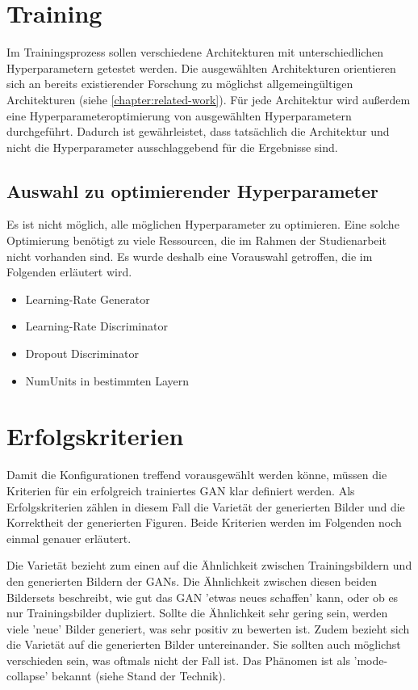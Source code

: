 \section{Training}
Im Trainingsprozess sollen verschiedene Architekturen mit unterschiedlichen Hyperparametern getestet werden.
Die ausgewählten Architekturen orientieren sich an bereits existierender Forschung zu möglichst allgemeingültigen Architekturen (siehe \cref{chapter:related-work}).
Für jede Architektur wird außerdem eine Hyperparameteroptimierung von ausgewählten Hyperparametern durchgeführt.
Dadurch ist gewährleistet, dass tatsächlich die Architektur und nicht die Hyperparameter ausschlaggebend für die Ergebnisse sind.


\subsection{Auswahl zu optimierender Hyperparameter}
Es ist nicht möglich, alle möglichen Hyperparameter zu optimieren.
Eine solche Optimierung benötigt zu viele Ressourcen, die im Rahmen der Studienarbeit nicht vorhanden sind.
Es wurde deshalb eine Vorauswahl getroffen, die im Folgenden erläutert wird.
\newline

\begin{itemize}
	\item Learning-Rate Generator
	\item Learning-Rate Discriminator
	\item Dropout Discriminator
	\item NumUnits in bestimmten Layern
\end{itemize}

\section{Erfolgskriterien}
Damit die Konfigurationen treffend vorausgewählt werden könne, müssen die Kriterien für ein erfolgreich trainiertes GAN klar definiert werden.
Als Erfolgskriterien zählen in diesem Fall die Varietät der generierten Bilder und die Korrektheit der generierten Figuren.
Beide Kriterien werden im Folgenden noch einmal genauer erläutert.

Die Varietät bezieht zum einen auf die Ähnlichkeit zwischen Trainingsbildern und den generierten Bildern der GANs.
Die Ähnlichkeit zwischen diesen beiden Bildersets beschreibt, wie gut das GAN 'etwas neues schaffen' kann, oder ob es nur Trainingsbilder dupliziert.
Sollte die Ähnlichkeit sehr gering sein, werden viele 'neue' Bilder generiert, was sehr positiv zu bewerten ist.
Zudem bezieht sich die Varietät auf die generierten Bilder untereinander.
Sie sollten auch möglichst verschieden sein, was oftmals nicht der Fall ist.
Das Phänomen ist als 'mode-collapse' bekannt (siehe Stand der Technik). %

